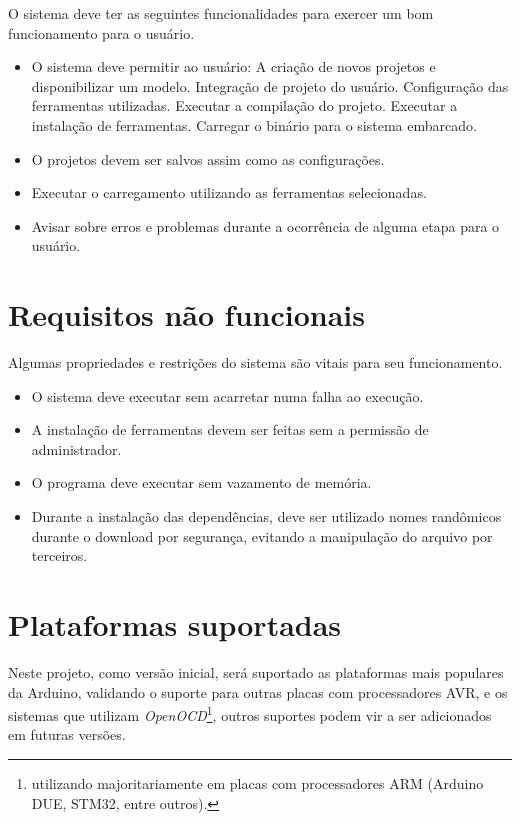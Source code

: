 O sistema deve ter as seguintes funcionalidades para exercer um bom funcionamento para o usuário.
\begin{itemize}
\item O sistema deve permitir ao usuário:
	\subitem A criação de novos projetos e disponibilizar um modelo.
	\subitem Integração de projeto do usuário.
    \subitem Configuração das ferramentas utilizadas.
	\subitem Executar a compilação do projeto.
	\subitem Executar a instalação de ferramentas.
	\subitem Carregar o binário para o sistema embarcado.
\item O projetos devem ser salvos assim como as configurações.
\item Executar o carregamento utilizando as ferramentas selecionadas.
\item Avisar sobre erros e problemas durante a ocorrência de alguma etapa para o usuário.	
\end{itemize}

\section{Requisitos não funcionais}
Algumas propriedades e restrições do sistema são vitais para seu funcionamento.
\begin{itemize}
\item O sistema deve executar sem acarretar numa falha ao execução.
\item A instalação de ferramentas devem ser feitas sem a permissão de administrador.
\item O programa deve executar sem vazamento de memória.
\item Durante a instalação das dependências, deve ser utilizado nomes randômicos durante o download por segurança, evitando a manipulação do arquivo por terceiros.
\end{itemize}

\section{Plataformas suportadas}

Neste projeto, como versão inicial, será suportado as plataformas mais populares da Arduino, validando o suporte para outras placas com processadores AVR, e os sistemas que utilizam \textit{OpenOCD}\footnote{utilizando majoritariamente em placas com processadores ARM (Arduino DUE, STM32, entre outros).}, outros suportes podem vir a ser adicionados em futuras versões.


